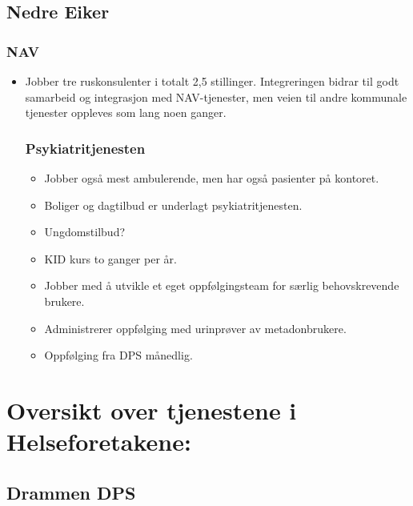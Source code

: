 \documentclass[11pt]{report} %
\begin{document}
                  \subsection{Nedre Eiker}\label{sec:org_nek}
                    \subsubsection{NAV}\label{sec:org_nek_nav}
                      \begin{itemize}
                      \item Jobber tre ruskonsulenter i totalt 2,5 stillinger. Integreringen bidrar til godt samarbeid og integrasjon med NAV-tjenester, men veien til andre kommunale tjenester oppleves som lang noen ganger. 
                    \subsubsection{Psykiatritjenesten}\label{sec:org_nek_psyk}  
                          \begin{itemize} 
                            \item Jobber også mest ambulerende, men har også pasienter på kontoret. 
                            \item Boliger og dagtilbud er underlagt psykiatritjenesten.
                            \item Ungdomstilbud?
                            \item KID kurs to ganger per år.
                            \item Jobber med å utvikle et eget oppfølgingsteam for særlig behovskrevende brukere. 
                            \item Administrerer oppfølging med urinprøver av metadonbrukere. 
                            \item Oppfølging fra DPS månedlig.
                          \end{itemize}
                      \end{itemize}
                      
                  \section{Oversikt over tjenestene i Helseforetakene:}
                    \subsection{Drammen DPS}\label{sec:org_ddps}
\end{document}
